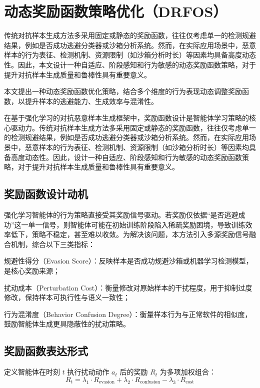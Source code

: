 \section{动态奖励函数策略优化（DRFOS）}

传统对抗样本生成方法多采用固定或静态的奖励函数，往往仅考虑单一的检测规避结果，例如是否成功逃避分类器或沙箱分析系统\cite{anderson2018learning}。然而，在实际应用场景中，恶意样本的行为表征、检测机制、资源限制（如沙箱分析时长）等因素均具备高度动态性。因此，本文设计一种自适应、阶段感知和行为敏感的动态奖励函数策略，对于提升对抗样本生成质量和鲁棒性具有重要意义。

本文提出一种动态奖励函数优化策略，结合多个维度的行为表现动态调整奖励函数，以提升样本的逃避能力、生成效率与混淆性。

在基于强化学习的对抗恶意样本生成框架中，奖励函数设计是智能体学习策略的核心驱动力。传统对抗样本生成方法多采用固定或静态的奖励函数，往往仅考虑单一的检测规避结果，例如是否成功逃避分类器或沙箱分析系统。然而，在实际应用场景中，恶意样本的行为表征、检测机制、资源限制（如沙箱分析时长）等因素均具备高度动态性。因此，设计一种自适应、阶段感知和行为敏感的动态奖励函数策略，对于提升对抗样本生成质量和鲁棒性具有重要意义。

\subsection{奖励函数设计动机}

强化学习智能体的行为策略直接受其奖励信号驱动。若奖励仅依据“是否逃避成功”这一单一信号，则智能体可能在初始训练阶段陷入稀疏奖励困境，导致训练效率低下，策略不稳定，甚至难以收敛。为解决该问题，本方法引入多源奖励信号融合机制，综合以下三类指标：

规避性得分（Evasion Score）：反映样本是否成功规避沙箱或机器学习检测模型，是核心奖励来源；

扰动成本（Perturbation Cost）：衡量修改对原始样本的干扰程度，用于抑制过度修改，保持样本可执行性与语义一致性；

行为混淆度（Behavior Confusion Degree）：衡量样本行为与正常软件的相似度，鼓励智能体生成更具隐蔽性的扰动策略。

\subsection{奖励函数表达形式}

定义智能体在时刻 $t$ 执行扰动动作 $a_t$ 后的奖励 $R_t$ 为多项加权组合：
\begin{equation}
	R_t = \lambda_1 \cdot R_{\text{evasion}} + \lambda_2 \cdot R_{\text{confusion}} - \lambda_3 \cdot R_{\text{cost}}
\end{equation}

